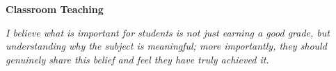 \documentclass{article}
\begin{document}
\vspace{.5em}\noindent\textbf{Classroom Teaching}\vspace{.5em}

\noindent \emph{I believe what is important for students is not just earning a good grade, but understanding why the subject is meaningful; more importantly, they should genuinely share this belief and feel they have truly achieved it.} 
\vspace{.5em}



\end{document}
